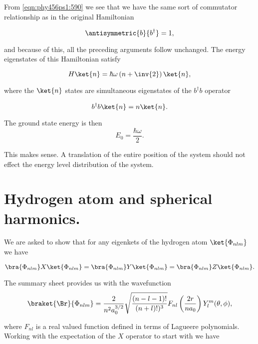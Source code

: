 From \ref{eqn:phy456ps1:590} we see that we have the same sort of commutator relationship as in the original Hamiltonian

\begin{equation}\label{eqn:phy456ps1:610}
\antisymmetric{b}{b^\dagger} = 1,
\end{equation}

and because of this, all the preceding arguments follow unchanged.  The energy eigenstates of this Hamiltonian satisfy

\begin{equation}\label{eqn:phy456ps1:620}
H \ket{n} = \hbar \omega \left( n + \inv{2} \right) \ket{n},
\end{equation}

where the $\ket{n}$ states are simultaneous eigenstates of the $b^\dagger b$ operator

\begin{equation}\label{eqn:phy456ps1:630}
b^\dagger b \ket{n} = n \ket{n}.
\end{equation}

The ground state energy is then
\begin{equation}\label{eqn:phy456ps1:640}
E_0 = \frac{\hbar \omega }{2}.
\end{equation}

This makes sense.  A translation of the entire position of the system should not effect the energy level distribution of the system.

\section{Hydrogen atom and spherical harmonics.}

We are asked to show that for any eigenkets of the hydrogen atom $\ket{\Phi_{nlm}}$ we have

\begin{equation}\label{eqn:phy456ps1:700}
\bra{\Phi_{nlm}} X \ket{\Phi_{nlm}} 
=
\bra{\Phi_{nlm}} Y \ket{\Phi_{nlm}} 
=
\bra{\Phi_{nlm}} Z \ket{\Phi_{nlm}}.
\end{equation}

The summary sheet provides us with the wavefunction
\begin{equation}\label{eqn:phy456ps1:720}
\braket{\Br}{\Phi_{nlm}} = 
\frac{2}{n^2 a_0^{3/2}} \sqrt{\frac{(n-l-1)!}{(n+l)!)^3}} F_{nl}\left( \frac{2r}{n a_0} \right) Y_l^m(\theta, \phi),
\end{equation}

where $F_{nl}$ is a real valued function defined in terms of Lagueere polynomials.  Working with the expectation of the $X$ operator to start with we have

